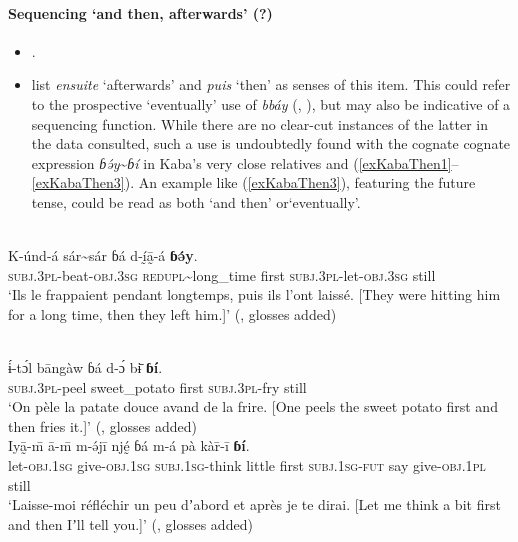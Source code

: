 \paragraph{Sequencing \lq and then, afterwards\rq{} (?)}\label{appendixKabaSequencing}
\begin{itemize}
	\item \textcite[310, 407]{MoserDingatoloum2007}.
	\item \textcite{MoserDingatoloum2007} list \textit{ensuite} \lq afterwards' and \textit{puis} \lq then\rq{ }as senses of this item.  This could refer to the prospective \lq eventually\rq{ }use of \textit{bbáy} (, ), but may also be indicative of a sequencing function. While there are no clear-cut instances of the latter in the data consulted, such a use is undoubtedly found with the cognate cognate expression \textit{ɓə́y}\sim{}\textit{ɓí} in Kaba's very close relatives  and  (\ref{exKabaThen1}–\ref{exKabaThen3}). An example like (\ref{exKabaThen3}), featuring the future tense, could be read as both \lq and then\rq{ }or\lq eventually\rq{}.
\end{itemize}
\begin{exe}
	\ex {}\label{exKabaThen1}\\
	\gll K-únd-á sár\sim{}sár ɓá d-ḭ́ā̰-á \textbf{ɓə́y}.\\
	\textsc{subj}.3\textsc{pl}-beat-\textsc{obj}.3\textsc{sg} \textsc{redupl}\sim{}long\_time first \textsc{subj}.3\textsc{pl}-let-\textsc{obj}.3\textsc{sg} still\\
	\glt \lq Ils le frappaient pendant longtemps, puis ils l'ont  laissé. [They were hitting him for a long time, then they left him.]\rq{ }(\cite[259]{Keegan2014}, glosses added)
	
	\ex {}\label{exKabaThen2}\\
	\gll ɨ́-tɔ́l bāngàw ɓá d-{ɔ́ bɨ̄} \textbf{ɓí}.\\
	\textsc{subj}.\textsc{3pl}-peel sweet\_potato first \textsc{subj}.\textsc{3pl}-fry still\\
	\glt \lq On pèle la patate douce avand de la frire. [One peels the sweet potato first and then fries it.]\rq{ }(\cite[123]{Keegan2014}, glosses added)
	\pagebreak
	\ex {}\label{exKabaThen3}\\
	\gll Iyā̰-m̄ ā-m̄ m-ə́jī njḛ́ ɓá m-á pà kàr̄-ī \textbf{ɓí}.\\
	let-\textsc{obj}.1\textsc{sg} give-\textsc{obj}.1\textsc{sg} \textsc{subj}.1\textsc{sg}-think little first \textsc{subj}.1\textsc{sg}-\textsc{fut} say give-\textsc{obj}.1\textsc{pl} still\\
	\glt \lq Laisse-moi réfléchir un peu dʼabord et après je te dirai. [Let me think a bit first and then Iʼll tell you.]\rq{ }(\cite[142]{Keegan2014}, glosses added)
\end{exe}

